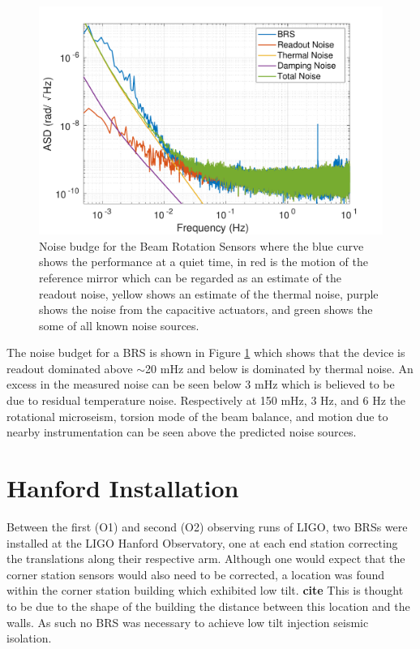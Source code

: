 \documentclass [12pt, proquest]{uwthesis}[2019]
\begin{document}
 \begin{figure}%
\begin{center}
\includegraphics[width=\textwidth]{BRSNoiseBudget.pdf}
\caption{Noise budge for the Beam Rotation Sensors where the blue curve shows the performance at a quiet time, in red is the motion of the reference mirror which can be regarded as an estimate of the readout noise, yellow shows an estimate of the thermal noise, purple shows the noise from the capacitive actuators, and green shows the some of all known noise sources.}
\label{noise}
\end{center}
\end{figure}

 The noise budget for a BRS is shown in Figure \ref{noise} which shows that the device is readout dominated above $\sim$20 mHz and below is dominated by thermal noise. An excess in the measured noise can be seen below 3 mHz which is believed to be due to residual temperature noise. Respectively at 150 mHz, 3 Hz, and 6 Hz the rotational microseism, torsion mode of the beam balance, and motion due to nearby instrumentation can be seen above the predicted noise sources.

\section{Hanford Installation} \label{BRS_Hanford}

\quad Between the first (O1) and second (O2) observing runs of LIGO, two BRSs were installed at the LIGO Hanford Observatory, one at each end station correcting the translations along their respective arm. Although one would expect that the corner station sensors would also need to be corrected, a location was found within the corner station building which exhibited low tilt. \textbf{cite} This is thought to be due to the shape of the building the distance between this location and the walls. As such no BRS was necessary to achieve low tilt injection seismic isolation.
\end{document}
